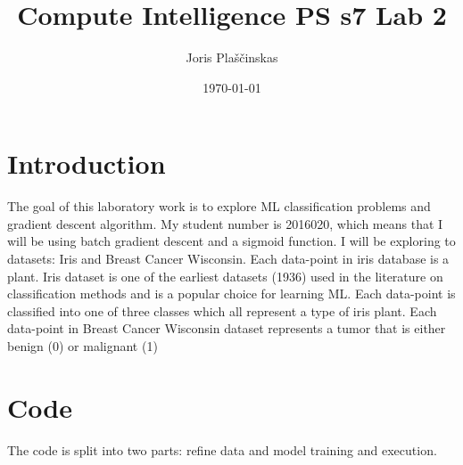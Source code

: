 \documentclass{article}
\title{Compute Intelligence PS s7 Lab 2}
\author{Joris Plaščinskas}
\date{\today}
\begin{document}
    \maketitle
    \section*{Introduction}
        The goal of this laboratory work is to explore ML classification problems and gradient descent algorithm. My student number is 2016020, which means that I will be using batch gradient descent and a sigmoid function. I will be exploring to datasets: Iris and Breast Cancer Wisconsin. Each data-point in iris database is a plant. Iris dataset is one of the earliest datasets (1936) used in the literature on classification methods and is a popular choice for learning ML. Each data-point is classified into one of three classes which all represent a type of iris plant. Each data-point in Breast Cancer Wisconsin dataset represents a tumor that is either benign (0) or malignant (1)

    \section*{Code}
        The code is split into two parts: refine data and model training and execution.
\end{document}

